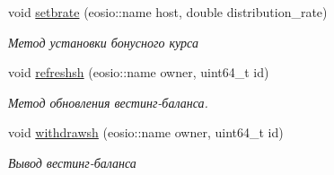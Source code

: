 \begin{DoxyCompactItemize}
$$void \mbox{\hyperlink{classp2p_a4f3c89b4ae21f54b6e16334e681a7860}{setbrate}} (eosio\+::name host, double distribution\+\_\+rate)
\begin{DoxyCompactList}\small\item\em Метод установки бонусного курса \end{DoxyCompactList}\item 
void \mbox{\hyperlink{classp2p_a2cb80d56fbb68ac3ccc688112d86532a}{refreshsh}} (eosio\+::name owner, uint64\+\_\+t id)
\begin{DoxyCompactList}\small\item\em Метод обновления вестинг-\/баланса. ~\newline
 \end{DoxyCompactList}\item 
void \mbox{\hyperlink{classp2p_adb4fde78468ee3b060717a785febdcc4}{withdrawsh}} (eosio\+::name owner, uint64\+\_\+t id)
\begin{DoxyCompactList}\small\item\em Вывод вестинг-\/баланса \end{DoxyCompactList}\end{DoxyCompactItemize}
